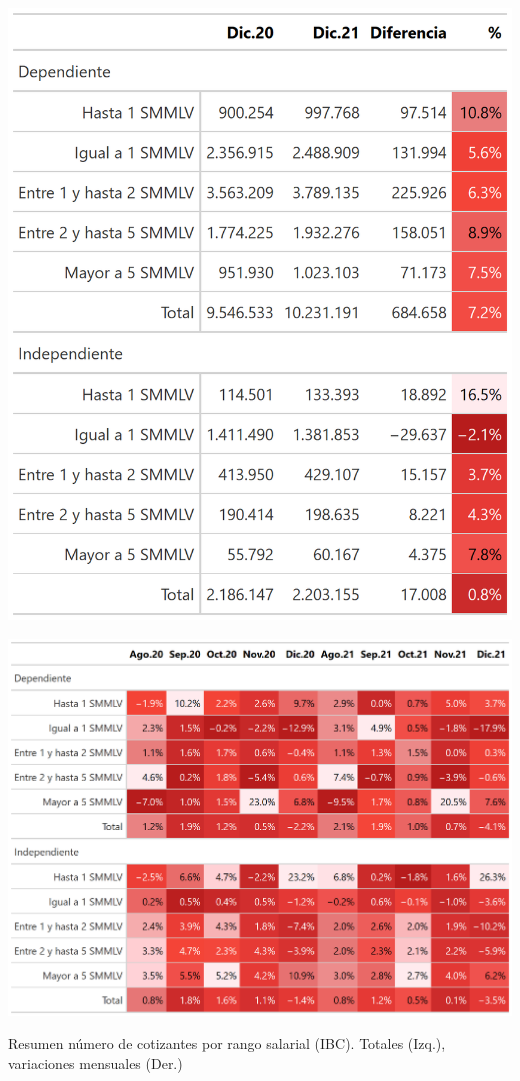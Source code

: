 \begin{table}[!h]
\centering
\begin{minipage}{0.5\textwidth}
  \centering
  \includegraphics[width=0.6\linewidth]{results/01_dinamica/salida_total_cotizantes.png}
\end{minipage}%
\begin{minipage}{0.5\textwidth}
  \centering
  \includegraphics[width=\linewidth]{results/01_dinamica/salida_total_cotizantes_variaciones.png}
\end{minipage}
\caption{Resumen número de cotizantes por rango salarial (IBC). Totales (Izq.), variaciones mensuales (Der.)}
\label{tabla:resumen:cotizantes_rangoIBC}
\end{table}


